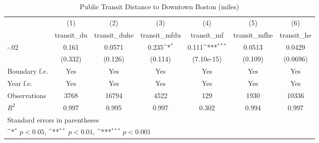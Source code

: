 \begin{table}[htbp]\centering
\def\sym#1{\ifmmode^{#1}\else\(^{#1}\)\fi}
\caption{Public Transit Distance to Downtown Boston (miles)}
\begin{tabular}{l*{6}{c}}
\hline\hline
                    &\multicolumn{1}{c}{(1)}&\multicolumn{1}{c}{(2)}&\multicolumn{1}{c}{(3)}&\multicolumn{1}{c}{(4)}&\multicolumn{1}{c}{(5)}&\multicolumn{1}{c}{(6)}\\
                    &\multicolumn{1}{c}{transit\_du}&\multicolumn{1}{c}{transit\_duhe}&\multicolumn{1}{c}{transit\_mfdu}&\multicolumn{1}{c}{transit\_mf}&\multicolumn{1}{c}{transit\_mfhe}&\multicolumn{1}{c}{transit\_he}\\
\hline
-.02                &       0.161         &      0.0571         &       0.235\sym{*}  &       0.111\sym{***}&      0.0513         &      0.0429         \\
                    &     (0.332)         &     (0.126)         &     (0.114)         &  (7.10e-15)         &     (0.109)         &    (0.0696)         \\
[1em]
Boundary f.e.       &         Yes         &         Yes         &         Yes         &         Yes         &         Yes         &         Yes         \\
[1em]
Year f.e.           &         Yes         &         Yes         &         Yes         &         Yes         &         Yes         &         Yes         \\
\hline
Observations        &        3768         &       16794         &        4522         &         129         &        1930         &       10336         \\
\(R^{2}\)           &       0.997         &       0.995         &       0.997         &       0.302         &       0.994         &       0.997         \\
\hline\hline
\multicolumn{7}{l}{\footnotesize Standard errors in parentheses}\\
\multicolumn{7}{l}{\footnotesize \sym{*} \(p<0.05\), \sym{**} \(p<0.01\), \sym{***} \(p<0.001\)}\\
\end{tabular}
\end{table}
